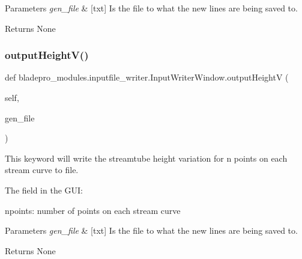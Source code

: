 \begin{DoxyParams}{Parameters}
{\em gen\+\_\+file} & \mbox{[}txt\mbox{]} Is the file to what the new lines are being saved to. \\
\hline
\end{DoxyParams}
\begin{DoxyReturn}{Returns}
None 
\end{DoxyReturn}
\hypertarget{a00071_a15fdf4aaecf99b885796124500f80114}{}\label{a00071_a15fdf4aaecf99b885796124500f80114} 
\subsubsection{\texorpdfstring{output\+Height\+V()}{outputHeightV()}}
{\footnotesize\ttfamily def bladepro\+\_\+modules.\+inputfile\+\_\+writer.\+Input\+Writer\+Window.\+output\+HeightV (\begin{DoxyParamCaption}\item[{}]{self,  }\item[{}]{gen\+\_\+file }\end{DoxyParamCaption})}



This keyword will write the streamtube height variation for n points on each stream curve to file. 

The field in the G\+UI\+: \begin{DoxyItemize}
\item {\ttfamily npoints\+:} number of points on each stream curve\end{DoxyItemize}

\begin{DoxyParams}{Parameters}
{\em gen\+\_\+file} & \mbox{[}txt\mbox{]} Is the file to what the new lines are being saved to. \\
\hline
\end{DoxyParams}
\begin{DoxyReturn}{Returns}
None 
\end{DoxyReturn}
\hypertarget{a00071_a8e556016279f9aabdabb9b6f708c95cb}{}\label{a00071_a8e556016279f9aabdabb9b6f708c95cb} 
